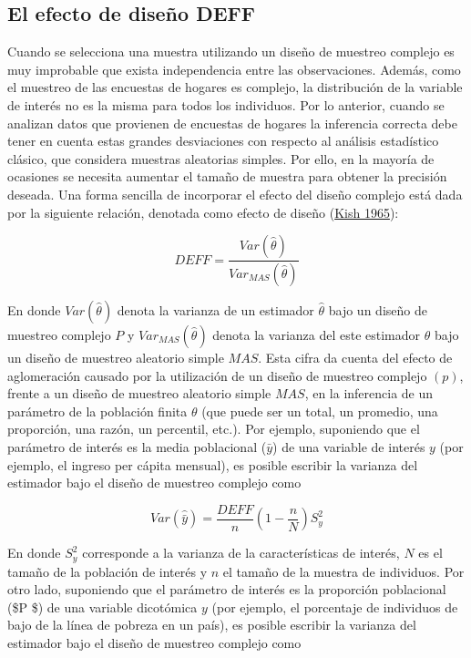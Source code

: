\documentclass[
  12pt,
  spanish,
]{book}
\begin{document}
\hypertarget{el-efecto-de-diseuxf1o-deff}{%
\subsection{El efecto de diseño DEFF}\label{el-efecto-de-diseuxf1o-deff}}

Cuando se selecciona una muestra utilizando un diseño de muestreo complejo es muy improbable que exista independencia entre las observaciones. Además, como el muestreo de las encuestas de hogares es complejo, la distribución de la variable de interés no es la misma para todos los individuos. Por lo anterior, cuando se analizan datos que provienen de encuestas de hogares la inferencia correcta debe tener en cuenta estas grandes desviaciones con respecto al análisis estadístico clásico, que considera muestras aleatorias simples. Por ello, en la mayoría de ocasiones se necesita aumentar el tamaño de muestra para obtener la precisión deseada. Una forma sencilla de incorporar el efecto del diseño complejo está dada por la siguiente relación, denotada como efecto de diseño (\protect\hyperlink{ref-Kish_1965}{Kish 1965}):

\[
DEFF=\frac{Var(\hat{\theta})}{Var_{MAS}(\hat{\theta})}
\]

En donde \(Var(\hat{\theta})\) denota la varianza de un estimador \(\hat{\theta}\) bajo un diseño de muestreo complejo \(P\) y \(Var_{MAS}(\hat{\theta})\) denota la varianza del este estimador \(\hat{\theta}\) bajo un diseño de muestreo aleatorio simple \(MAS\). Esta cifra da cuenta del efecto de aglomeración causado por la utilización de un diseño de muestreo complejo \((p)\), frente a un diseño de muestreo aleatorio simple \(MAS\), en la inferencia de un parámetro de la población finita \(\theta\) (que puede ser un total, un promedio, una proporción, una razón, un percentil, etc.). Por ejemplo, suponiendo que el parámetro de interés es la media poblacional (\(\bar{y}\)) de una variable de interés \(y\) (por ejemplo, el ingreso per cápita mensual), es posible escribir la varianza del estimador bajo el diseño de muestreo complejo como

\[
Var(\hat{\bar{y}}) = \frac{DEFF}{n}\left(1-\frac{n}{N}\right)S^2_{y}
\]

En donde \(S^2_{y}\) corresponde a la varianza de la características de interés, \(N\) es el tamaño de la población de interés y \(n\) el tamaño de la muestra de individuos. Por otro lado, suponiendo que el parámetro de interés es la proporción poblacional (\$P \$) de una variable dicotómica \(y\) (por ejemplo, el porcentaje de individuos de bajo de la línea de pobreza en un país), es posible escribir la varianza del estimador bajo el diseño de muestreo complejo como
\end{document}
